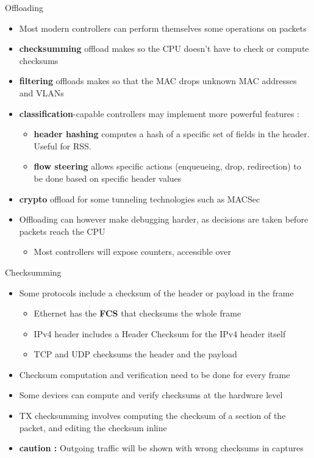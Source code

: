 \begin{frame}{Offloading}
	\begin{itemize}
		\item Most modern controllers can perform themselves some operations on packets
		\item \textbf{checksumming} offload makes so the CPU doesn't have to check or compute checksums
		\item \textbf{filtering} offloads makes so that the MAC drops unknown MAC addresses and VLANs
		\item \textbf{classification}-capable controllers may implement more powerful features :
			\begin{itemize}
				\item \textbf{header hashing} computes a hash of a specific set of fields in the header. Useful for RSS.
				\item \textbf{flow steering} allows specific actions (enqueueing, drop, redirection) to be done based on specific header values
			\end{itemize}
		\item \textbf{crypto} offload for some tunneling technologies such as MACSec
		\item Offloading can however make debugging harder, as decisions are taken before packets reach the CPU
			\begin{itemize}
				\item Most controllers will expose counters, accessible over 
			\end{itemize}
	\end{itemize}
\end{frame}

\begin{frame}{Checksumming}
	\begin{itemize}
		\item Some protocols include a checksum of the header or payload in the frame
			\begin{itemize}
				\item Ethernet has the \textbf{FCS} that checksums the whole frame
				\item IPv4 header includes a Header Checksum for the IPv4 header itself
				\item TCP and UDP checksums the header and the payload
			\end{itemize}
		\item Checksum computation and verification need to be done for every frame
		\item Some devices can compute and verify checksums at the hardware level
		\item TX checksumming involves computing the checksum of a section of the packet, and editing the checksum inline
		\item \textbf{caution :} Outgoing traffic will be shown with wrong checksums in captures
	\end{itemize}
\end{frame}

